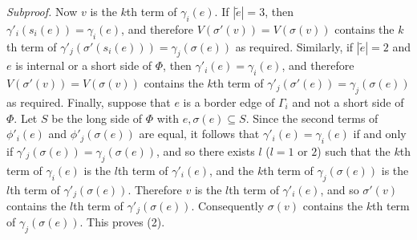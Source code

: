 \textit{Subproof.} Now $v$ is the $k$th term of $\gamma_i(e)$. If $|\tilde{e}|=3$, then $\gamma'_i(s_i(e)) = \gamma_i(e)$, and therefore $V(\sigma'(v)) = V(\sigma(v))$ contains the $k$th term of $\gamma'_j(\sigma'(s_i(e))) = \gamma_j(\sigma(e))$ as required. Similarly, if $|\tilde{e}|=2$ and $e$ is internal or a short side of $\Phi$, then $\gamma'_i(e) = \gamma_i(e)$, and therefore $V(\sigma'(v)) = V(\sigma(v))$ contains the $k$th term of $\gamma'_j(\sigma'(e)) = \gamma_j(\sigma(e))$ as required. Finally, suppose that $e$ is a border edge of $\Gamma_i$ and not a short side of $\Phi$. Let $S$ be the long side of $\Phi$ with $e,\sigma(e)\subseteq S$. Since the second terms of $\phi'_i(e)$ and $\phi'_j(\sigma(e))$ are equal, it follows that $\gamma'_i(e) = \gamma_i(e)$ if and only if $\gamma'_j(\sigma(e)) = \gamma_j(\sigma(e))$, and so there exists $l$ ($l=1$ or $2$) such that the $k$th term of $\gamma_i(e)$ is the $l$th term of $\gamma'_i(e)$, and the $k$th term of $\gamma_j(\sigma(e))$ is the $l$th term of $\gamma'_j(\sigma(e))$. Therefore $v$ is the $l$th term of $\gamma'_i(e)$, and so $\sigma'(v)$ contains the $l$th term of $\gamma'_j(\sigma(e))$. Consequently $\sigma(v)$ contains the $k$th term of $\gamma_j(\sigma(e))$. This proves (2).

